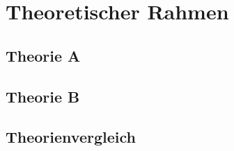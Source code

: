 \chapter{Theoretischer Rahmen}\label{chap:theorie}

\section{Theorie A}\label{sec:theorie-a}

\section{Theorie B}\label{sec:theorie-b}

\section{Theorienvergleich}\label{sec:theorienvergleich}
